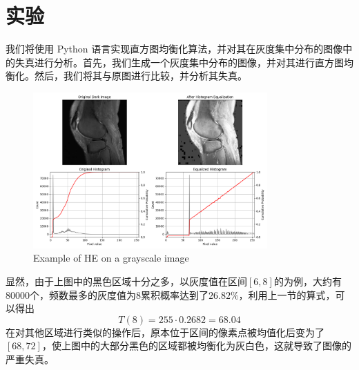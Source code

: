 \documentclass{ctexart}
\begin{document}
\section{实验}
   我们将使用 Python 语言实现直方图均衡化算法，并对其在灰度集中分布的图像中的失真进行分析。首先，我们生成一个灰度集中分布的图像，并对其进行直方图均衡化。然后，我们将其与原图进行比较，并分析其失真。
\begin{figure}[http]
        \centering
      
    \includegraphics[width=0.8\textwidth]{Figure_1.png}
       \caption{Example of HE on a grayscale image}
    \end{figure}
   
显然，由于上图中的黑色区域十分之多，以灰度值在区间$[6,8]$的为例，大约有$80000$个，频数最多的灰度值为$8$累积概率达到了$26.82\%$，利用上一节的算式，可以得出\[T(8)=255\cdot 0.2682=68.04\]
在对其他区域进行类似的操作后，原本位于区间的像素点被均值化后变为了$[68,72]$，使上图中的大部分黑色的区域都被均衡化为灰白色，这就导致了图像的严重失真。
\end{document}
